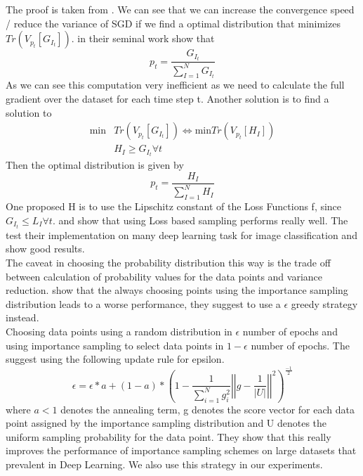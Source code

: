 \documentclass[a4paper,twoside]{iiththesis}
\theoremstyle{definition}
\theoremstyle{definition}
\theoremstyle{remark}
\begin{document}
The proof is taken from \cite{katharopoulos2018not}. We can see that we can increase the convergence speed / reduce the variance of SGD if we find a optimal distribution that  minimizes $ Tr(V_{p_t}[G_{I_t}])$.
\cite{zhao2015stochastic} in their seminal work show that 
\begin{equation}
p_t = \frac{G_{I_t}} {\sum_{I=1}^N G_{I_t}}
\end{equation}
As we can see this computation very inefficient as we need to calculate the full gradient over the dataset for each time step t. Another solution is to find a solution to 
\begin{align}
\text{min} &Tr(V_{p_t}[G_{I_t}]) \iff \text{min} Tr(V_{p_t} [H_{I}])\\
& H_I \geq G_{I_t}  \forall t
\end{align}
Then the optimal distribution is given by 
\begin{equation}
p_t = \frac{H_{I}} {\sum_{I=1}^N H_{I}}
\end{equation}
One proposed H is to use the Lipschitz constant of the Loss Functions f, since $G_{I_t} \leq L_I \forall {t}$.
\cite{loshchilov2015online} and \cite{katharopoulos2017biased} show that using Loss based sampling performs really well. The test their implementation on many deep learning task for image classification and show good results. \\
The caveat in choosing the probability distribution this way is the trade off between calculation of probability values for the data points and variance reduction. \cite{katharopoulos2018not} show that the 
always choosing points using the importance sampling distribution leads to a worse performance, they suggest to use a $\epsilon$ greedy strategy instead. \\Choosing data points using a random distribution  in $\epsilon$ number of epochs and using importance sampling to select data points in $1-\epsilon$ number of epochs. The suggest using the following update rule for epsilon.
\begin{equation}\label{Fixed Eps}
\epsilon  = \epsilon * a + (1-a) * \left(1 - \frac{1}{\sum_{i=1}^N g_{i}^2} \left | \left | g - \frac{1}{|U|} \right| \right|^2 \right)^\frac{-1}{2}
\end{equation}
where $a  < 1 $ denotes the annealing term, g denotes the score vector for each data point assigned by the importance sampling distribution and U denotes the uniform sampling probability for the data point. They show that this really improves the performance of importance sampling schemes on large datasets that prevalent in Deep Learning. We also use this strategy in our experiments.
\end{document}

